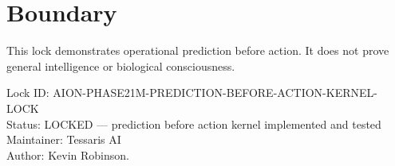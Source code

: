 \documentclass[11pt,a4paper]{article}
\begin{document}
\section{Boundary}

This lock demonstrates operational prediction before action. It does not prove general intelligence or biological consciousness.

\bigskip

\noindent
Lock ID: AION-PHASE21M-PREDICTION-BEFORE-ACTION-KERNEL-LOCK\\
Status: LOCKED --- prediction before action kernel implemented and tested\\
Maintainer: Tessaris AI\\
Author: Kevin Robinson.
\end{document}
